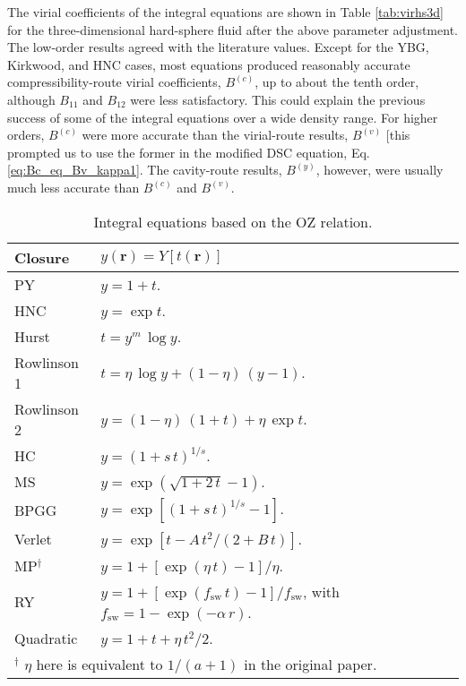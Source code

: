 \documentclass[aip,jcp,preprint,superscriptaddress,showpacs,preprintnumbers,amsmath,amssymb]{revtex4-1}
\newcommand{\vct}[1]{\mathbf{#1}}
\providecommand{\vr}{} %
\renewcommand{\vr}{\vct{r}}
\begin{document}
The virial coefficients of the integral equations
are shown in Table \ref{tab:virhs3d}
for the three-dimensional hard-sphere fluid
after the above parameter adjustment.
%
The low-order results agreed with the literature values.
%
Except for the YBG, Kirkwood, and HNC cases,
most equations produced reasonably accurate
compressibility-route virial coefficients, $B^{(c)}$,
up to about the tenth order,
although $B_{11}$ and $B_{12}$ were less satisfactory.
%
This could explain the previous success of
some of the integral equations
over a wide density range.
%
For higher orders,
$B^{(c)}$ were more accurate than
the virial-route results, $B^{(v)}$
[this prompted us to use the former
in the modified DSC equation,
Eq. \eqref{eq:Bc_eq_Bv_kappa1}.
%
The cavity-route results, $B^{(y)}$,
however, were usually much less accurate than
$B^{(c)}$ and $B^{(v)}$.



\begin{table}
\begin{tabular}{ l l l l }
\hline
Closure
&
$y(\vr) = Y[t(\vr)]$
\\ \hline
%
PY\cite{percusyevick}
&
$y = 1+t$.
\\
HNC\cite{
morita1958, *morita1959, morita1960,
vanleeuwen1959,
*meeron1960, *verlet1960, *green1960,
*rushbrooke1960}
&
$y = \exp t$.
\\
Hurst\cite{hurst1965}
&
$t = y^m \, \log y$.
\\
Rowlinson 1\cite{rowlinson1965}
&
$t = \eta \, \log y + (1 - \eta) \, (y - 1)$.
\\
Rowlinson 2\cite{rowlinson1966}
&
$y = (1 - \eta) \, (1 + t) + \eta \, \exp t$.
\\
HC\cite{hutchinson1971, hutchinson1972}
&
$y = (1 + s \, t)^{1/s}$.
\\
MS\cite{martynov1983}
&
$y = \exp\left( \sqrt{1+2 \, t} - 1 \right)$.
\\
BPGG\cite{ballone1986}
&
$y = \exp\left[ (1 + s\,t)^{1/s} - 1\right]$.
\\
Verlet\cite{verlet1980}
&
$y = \exp\left[ t - A \, t^2/(2 + B \, t) \right]$.
\\
MP\cite{marucho2007}$^\dagger$
&
$y = 1 + [\exp(\eta \, t) - 1]/\eta$.
\\
RY
&
$y = 1+[\exp(f_\mathrm{sw} \, t) - 1] / f_\mathrm{sw}$,
with $f_\mathrm{sw} = 1 - \exp(-\alpha \, r)$.
\\
Quadratic
&
$y = 1 + t + \eta \, t^2/2$.
\\ \hline
\multicolumn{2}{p{\linewidth}}{
$^\dagger$
$\eta$ here is equivalent to $1/(a+1)$ in the original paper\cite{
marucho2007}.
}
\\ \hline
%
\end{tabular}
\caption{
Integral equations based on the OZ relation.
}
\label{tab:closures}
\end{table}
\end{document}
